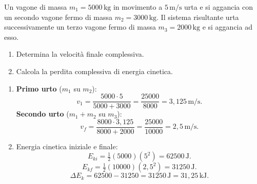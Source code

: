 \begin{question}[ID=3.5, subtitle={Urti anelastici sequenziali tra tre vagoni}, tags={urti anelastici, sistemi complessi}, difficulty=difficile]
Un vagone di massa \(m_1 = 5000 \, \text{kg}\) in movimento a \(5 \, \text{m/s}\) urta e si aggancia con un secondo vagone fermo di massa \(m_2 = 3000 \, \text{kg}\). Il sistema risultante urta successivamente un terzo vagone fermo di massa \(m_3 = 2000 \, \text{kg}\) e si aggancia ad esso.
\begin{enumerate}
    \item Determina la velocità finale complessiva.
    \item Calcola la perdita complessiva di energia cinetica.
\end{enumerate}
\begin{solution}
    \begin{enumerate}
        \item \textbf{Primo urto} (\(m_1\) su \(m_2\)):
        \[
            v_1 = \frac{5000 \cdot 5}{5000 + 3000} = \frac{25000}{8000} = 3{,}125 \, \text{m/s}.
        \]
        \textbf{Secondo urto} (\(m_1 + m_2\) su \(m_3\)):
        \[
            v_f = \frac{8000 \cdot 3{,}125}{8000 + 2000} = \frac{25000}{10000} = 2{,}5 \, \text{m/s}.
        \]
        \item Energia cinetica iniziale e finale:
        \[
            E_{ki} = \tfrac{1}{2}(5000)(5^2) = 62500 \, \text{J}.
        \]
        \[
            E_{kf} = \tfrac{1}{2}(10000)(2{,}5^2) = 31250 \, \text{J}.
        \]
        \[
            \Delta E_k = 62500 - 31250 = 31250 \, \text{J} = 31{,}25 \, \text{kJ}.
        \]
    \end{enumerate}
\end{solution}
\end{question}


